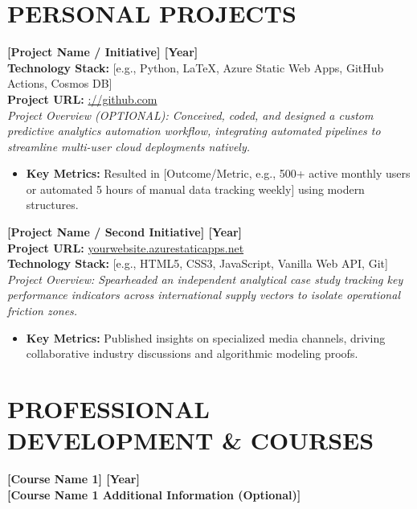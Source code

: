 \documentclass[10pt,a4paper]{article}
\newcommand{\resumeline}{\vspace{-8pt}\noindent\makebox[\linewidth]{\rule{\linewidth}{0.5pt}}\vspace{4pt}}
\begin{document}
	\section*{PERSONAL PROJECTS}
	\resumeline
	
	\noindent \textbf{[Project Name / Initiative] \hfill [Year]} \\
	\noindent \textbf{Technology Stack:} [e.g., Python, LaTeX, Azure Static Web Apps, GitHub Actions, Cosmos DB] \\
	\noindent \textbf{Project URL:} \href{https://github.com}{://github.com} \\
	\noindent \textit{Project Overview (OPTIONAL): Conceived, coded, and designed a custom predictive analytics automation workflow, integrating automated pipelines to streamline multi-user cloud deployments natively.}	
	\begin{itemize}
		\item \textbf{Key Metrics:} Resulted in [Outcome/Metric, e.g., 500+ active monthly users or automated 5 hours of manual data tracking weekly] using modern structures.
	\end{itemize}
	
	\vspace{6pt}
	
	\noindent \textbf{[Project Name / Second Initiative] \hfill [Year]} \\
	\noindent \textbf{Project URL:} \href{https://azurestaticapps.net}{yourwebsite.azurestaticapps.net} \\
	\noindent \textbf{Technology Stack:} [e.g., HTML5, CSS3, JavaScript, Vanilla Web API, Git] \\
	\noindent \textit{Project Overview: Spearheaded an independent analytical case study tracking key performance indicators across international supply vectors to isolate operational friction zones.}
	\begin{itemize}
		\item \textbf{Key Metrics:} Published insights on specialized media channels, driving collaborative industry discussions and algorithmic modeling proofs.
	\end{itemize}
	
	\section*{PROFESSIONAL DEVELOPMENT \& COURSES}
	\resumeline
	
	\noindent \textbf{[Course Name 1] \hfill [Year]} \\
	\textbf{[Course Name 1 Additional Information (Optional)]}
	\vspace{2pt}
	
\end{document}
